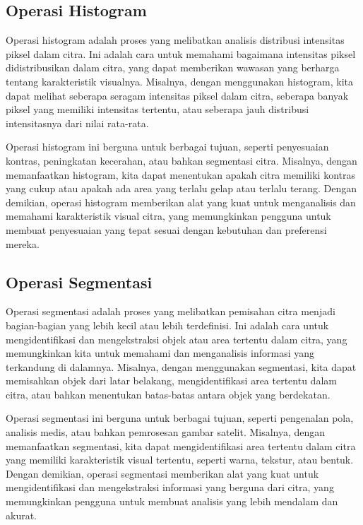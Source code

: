 \documentclass[a4paper,12pt,openany]{book}
\begin{document}
\subsection{Operasi Histogram}

Operasi histogram adalah proses yang melibatkan analisis distribusi intensitas piksel dalam citra. Ini adalah cara untuk memahami bagaimana intensitas piksel didistribusikan dalam citra, yang dapat memberikan wawasan yang berharga tentang karakteristik visualnya. Misalnya, dengan menggunakan histogram, kita dapat melihat seberapa seragam intensitas piksel dalam citra, seberapa banyak piksel yang memiliki intensitas tertentu, atau seberapa jauh distribusi intensitasnya dari nilai rata-rata.

Operasi histogram ini berguna untuk berbagai tujuan, seperti penyesuaian kontras, peningkatan kecerahan, atau bahkan segmentasi citra. Misalnya, dengan memanfaatkan histogram, kita dapat menentukan apakah citra memiliki kontras yang cukup atau apakah ada area yang terlalu gelap atau terlalu terang. Dengan demikian, operasi histogram memberikan alat yang kuat untuk menganalisis dan memahami karakteristik visual citra, yang memungkinkan pengguna untuk membuat penyesuaian yang tepat sesuai dengan kebutuhan dan preferensi mereka.

\subsection{Operasi Segmentasi}

Operasi segmentasi adalah proses yang melibatkan pemisahan citra menjadi bagian-bagian yang lebih kecil atau lebih terdefinisi. Ini adalah cara untuk mengidentifikasi dan mengekstraksi objek atau area tertentu dalam citra, yang memungkinkan kita untuk memahami dan menganalisis informasi yang terkandung di dalamnya. Misalnya, dengan menggunakan segmentasi, kita dapat memisahkan objek dari latar belakang, mengidentifikasi area tertentu dalam citra, atau bahkan menentukan batas-batas antara objek yang berdekatan.

Operasi segmentasi ini berguna untuk berbagai tujuan, seperti pengenalan pola, analisis medis, atau bahkan pemrosesan gambar satelit. Misalnya, dengan memanfaatkan segmentasi, kita dapat mengidentifikasi area tertentu dalam citra yang memiliki karakteristik visual tertentu, seperti warna, tekstur, atau bentuk. Dengan demikian, operasi segmentasi memberikan alat yang kuat untuk mengidentifikasi dan mengekstraksi informasi yang berguna dari citra, yang memungkinkan pengguna untuk membuat analisis yang lebih mendalam dan akurat.
\end{document}
